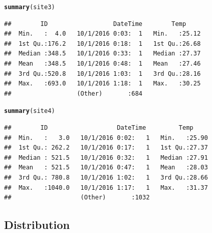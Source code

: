 \documentclass{article}\usepackage[]{graphicx}\usepackage[]{color}
\makeatletter
\newcommand{\hlstd}[1]{\textcolor[rgb]{0.345,0.345,0.345}{#1}}%
\newcommand{\hlkwd}[1]{\textcolor[rgb]{0.737,0.353,0.396}{\textbf{#1}}}%
\newenvironment{kframe}{%
 \def\at@end@of@kframe{}%
 \ifinner\ifhmode%
  \def\at@end@of@kframe{\end{minipage}}%
  \begin{minipage}{\columnwidth}%
 \fi\fi%
 \def\FrameCommand##1{\hskip\@totalleftmargin \hskip-\fboxsep
 \colorbox{shadecolor}{##1}\hskip-\fboxsep
     \hskip-\linewidth \hskip-\@totalleftmargin \hskip\columnwidth}%
 \MakeFramed {\advance\hsize-\width
   \@totalleftmargin\z@ \linewidth\hsize
   \@setminipage}}%
 {\par\unskip\endMakeFramed%
 \at@end@of@kframe}
\newenvironment{knitrout}{}{} %
\makeatother
\begin{document}
\begin{knitrout}
\color{fgcolor}\begin{kframe}
\begin{alltt}
\hlkwd{summary}\hlstd{(site3)}
\end{alltt}
\begin{verbatim}
##        ID                  DateTime        Temp      
##  Min.   :  4.0   10/1/2016 0:03:  1   Min.   :25.12  
##  1st Qu.:176.2   10/1/2016 0:18:  1   1st Qu.:26.68  
##  Median :348.5   10/1/2016 0:33:  1   Median :27.37  
##  Mean   :348.5   10/1/2016 0:48:  1   Mean   :27.46  
##  3rd Qu.:520.8   10/1/2016 1:03:  1   3rd Qu.:28.16  
##  Max.   :693.0   10/1/2016 1:18:  1   Max.   :30.25  
##                  (Other)       :684
\end{verbatim}
\end{kframe}
\end{knitrout}

\begin{knitrout}
\color{fgcolor}\begin{kframe}
\begin{alltt}
\hlkwd{summary}\hlstd{(site4)}
\end{alltt}
\begin{verbatim}
##        ID                   DateTime         Temp      
##  Min.   :   3.0   10/1/2016 0:02:   1   Min.   :25.90  
##  1st Qu.: 262.2   10/1/2016 0:17:   1   1st Qu.:27.37  
##  Median : 521.5   10/1/2016 0:32:   1   Median :27.91  
##  Mean   : 521.5   10/1/2016 0:47:   1   Mean   :28.03  
##  3rd Qu.: 780.8   10/1/2016 1:02:   1   3rd Qu.:28.66  
##  Max.   :1040.0   10/1/2016 1:17:   1   Max.   :31.37  
##                   (Other)       :1032
\end{verbatim}
\end{kframe}
\end{knitrout}

\subsection{Distribution}
\end{document}
